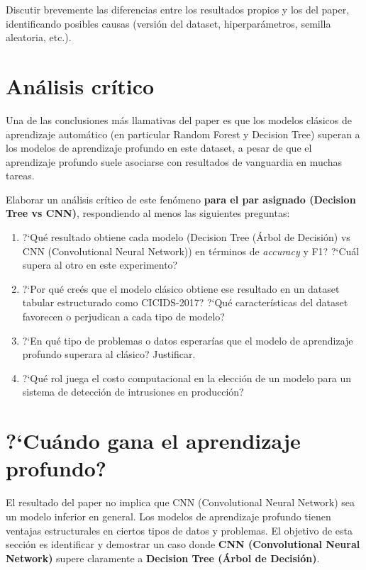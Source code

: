 \documentclass[11pt,a4paper]{article}
\begin{document}
Discutir brevemente las diferencias entre los resultados propios y los del paper, identificando posibles causas (versi\'on del dataset, hiperpar\'ametros, semilla aleatoria, etc.).

\section{An\'alisis cr\'itico}
Una de las conclusiones m\'as llamativas del paper es que los modelos cl\'asicos de aprendizaje autom\'atico (en particular Random Forest y Decision Tree) superan a los modelos de aprendizaje profundo en este dataset, a pesar de que el aprendizaje profundo suele asociarse con resultados de vanguardia en muchas tareas.

Elaborar un an\'alisis cr\'itico de este fen\'omeno \textbf{para el par asignado (Decision Tree vs CNN)}, respondiendo al menos las siguientes preguntas:
\begin{enumerate}[leftmargin=2em,itemsep=2pt]
    \item ?`Qu\'e resultado obtiene cada modelo (Decision Tree (Árbol de Decisión) vs CNN (Convolutional Neural Network)) en t\'erminos de \textit{accuracy} y F1? ?`Cu\'al supera al otro en este experimento?
    \item ?`Por qu\'e cre\'es que el modelo cl\'asico obtiene ese resultado en un dataset tabular estructurado como CICIDS-2017? ?`Qu\'e caracter\'isticas del dataset favorecen o perjudican a cada tipo de modelo?
    \item ?`En qu\'e tipo de problemas o datos esperar\'ias que el modelo de aprendizaje profundo superara al cl\'asico? Justificar.
    \item ?`Qu\'e rol juega el costo computacional en la elecci\'on de un modelo para un sistema de detecci\'on de intrusiones en producci\'on?
\end{enumerate}

\section{?`Cu\'ando gana el aprendizaje profundo?}
El resultado del paper no implica que CNN (Convolutional Neural Network) sea un modelo inferior en general. Los modelos de aprendizaje profundo tienen ventajas estructurales en ciertos tipos de datos y problemas. El objetivo de esta secci\'on es identificar y demostrar un caso donde \textbf{CNN (Convolutional Neural Network)} supere claramente a \textbf{Decision Tree (Árbol de Decisión)}.
\end{document}
